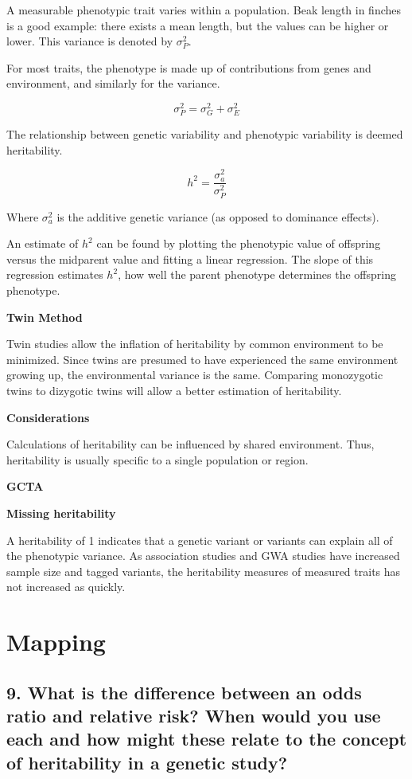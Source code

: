 \documentclass{tufte-handout}
\theoremstyle{noparens}
\begin{document}
A measurable phenotypic trait varies within a population. Beak length in finches is a good example: there exists a mean length, but the values can be higher or lower. This variance is denoted by $\sigma_P^2$.

For most traits, the phenotype is made up of contributions from genes and environment, and similarly for the variance.

\[ \sigma_P^2 = \sigma_G^2 + \sigma_E^2 \]

The relationship between genetic variability and phenotypic variability is deemed heritability. 

\[ h^2 = \frac{\sigma_a^2}{\sigma_P^2} \]

Where $\sigma_a^2$ is the additive genetic variance (as opposed to dominance effects).

An estimate of $h^2$ can be found by plotting the phenotypic value of offspring versus the midparent value and fitting a linear regression. The slope of this regression estimates $h^2$, how well the parent phenotype determines the offspring phenotype.

\textbf{Twin Method}

Twin studies allow the inflation of heritability by common environment to be minimized. Since twins are presumed to have experienced the same environment growing up, the environmental variance is the same. Comparing monozygotic twins to dizygotic twins will allow a better estimation of heritability. 

\textbf{Considerations}

Calculations of heritability can be influenced by shared environment. Thus, heritability is usually specific to a single population or region.

\textbf{GCTA}

\textbf{Missing heritability}

A heritability of 1 indicates that a genetic variant or variants can explain all of the phenotypic variance. As association studies and GWA studies have increased sample size and tagged variants, the heritability measures of measured traits has not increased as quickly.

\newpage
\section{Mapping}\label{sec:map}

\subsection{9.
What is the difference between an odds ratio and relative risk? When would you use each and how might these relate to the concept of heritability in a genetic study?
}
\end{document}

